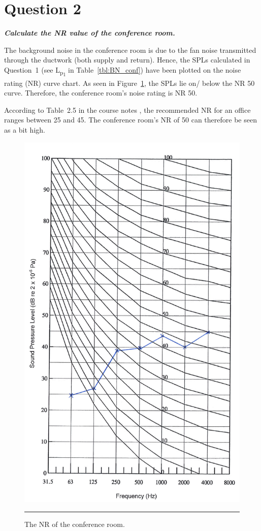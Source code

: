 \section{Question 2} \label{sec:Q2}

\textit{\textbf{Calculate the NR value of the conference room.}}

The background noise in the conference room is due to the fan noise transmitted through the ductwork (both supply and return).
Hence, the SPLs calculated in Question~1 (see L\textsubscript{p\textsubscript{1}} in Table~\ref{tbl:BN_conf}) have been plotted on the noise rating (NR) curve chart.
As seen in Figure~\ref{fig:NR_conf}, the SPLs lie on/ below the NR 50 curve.
Therefore, the conference room's noise rating is NR 50.

According to Table~2.5 in the course notes \citep{unit2}, the recommended NR for an office ranges between 25 and 45.
The conference room's NR of 50 can therefore be seen as a bit high.

\begin{figure}[htbp]
	\centering
	\includegraphics[height=.6\textheight]{figures/NR_conference.jpg}
	\rule{.6\textwidth}{0.5pt} %
	\caption{The NR of the conference room.}
	\label{fig:NR_conf}
\end{figure}